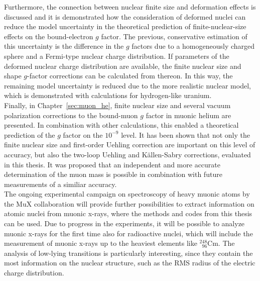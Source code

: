 Furthermore, the connection between nuclear finite size and deformation effects is discussed and it is demonstrated how the consideration of deformed nuclei can reduce the model uncertainty in the theoretical prediction of finite-nuclear-size effects on the bound-electron $g$ factor. The previous, conservative estimation of this uncertainty is the difference in the $g$ factors due to a homogeneously charged sphere and a Fermi-type nuclear charge distribution. If parameters of the deformed nuclear charge distribution are available, the finite nuclear size and shape $g$-factor corrections can be calculated from thereon. In this way, the remaining model uncertainty is reduced due to the more realistic nuclear model, which is demonstrated with calculations for hydrogen-like uranium.\\[11pt]%
%
Finally, in Chapter~\ref{sec:muon_he}, finite nuclear size and several vacuum polarization corrections to the bound-muon $g$ factor in muonic helium are presented. In combination with other calculations, this enabled a theoretical prediction of the $g$ factor on the $10^{-9}$ level. It has been shown that not only the finite nuclear size and first-order Uehling correction are important on this level of accuracy, but also the two-loop Uehling and Källen-Sabry corrections, evaluated in this thesis. 
It was proposed that an independent and more accurate determination of the muon mass is possible in combination with future measurements of a similiar accuracy.\\[11pt]%
%
The ongoing experimental campaign on spectroscopy of heavy muonic atoms by the MuX collaboration will provide further possibilities to extract information on atomic nuclei from muonic x-rays, where the methods and codes from this thesis can be used. 
Due to progress in the experiments, it will be possible to analyze muonic x-rays for the first time also for radioactive nuclei, which will include the measurement of muonic x-rays up to the heaviest elements like $_{\phantom{1}96}^{248}$Cm. 
The analysis of low-lying transitions is particularly interesting, since they contain the most information on the nuclear structure, such as the RMS radius of the electric charge distribution.

